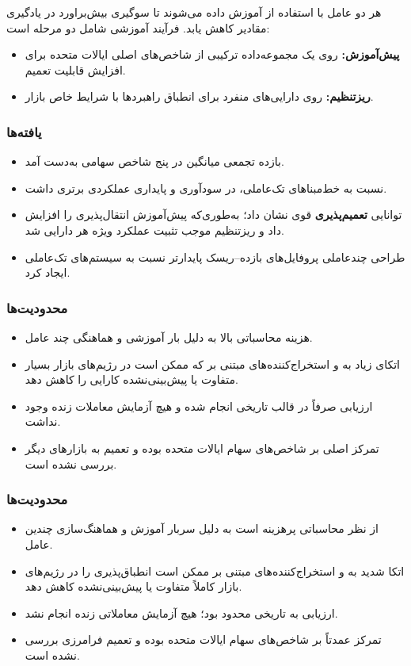 \documentclass[12pt, a4paper]{report}
\begin{document}
هر دو عامل با استفاده از  آموزش داده می‌شوند تا سوگیری بیش‌براورد در یادگیری مقادیر  کاهش یابد. فرآیند آموزشی شامل دو مرحله است:
\begin{itemize}
    \item \textbf{پیش‌آموزش:} روی یک مجموعه‌داده ترکیبی از شاخص‌های اصلی ایالات متحده برای افزایش قابلیت تعمیم.  
    \item \textbf{ریزتنظیم:} روی دارایی‌های منفرد برای انطباق راهبردها با شرایط خاص بازار.  
\end{itemize}

\subsubsection{یافته‌ها}
\begin{itemize}
    \item بازده تجمعی میانگین  در پنج شاخص سهامی به‌دست آمد.  
    \item نسبت به خط‌مبناهای تک‌عاملی، در سودآوری و پایداری عملکردی برتری داشت.  
    \item توانایی \textbf{تعمیم‌پذیری} قوی نشان داد؛ به‌طوری‌که پیش‌آموزش انتقال‌پذیری را افزایش داد و ریزتنظیم موجب تثبیت عملکرد ویژه هر دارایی شد.  
    \item طراحی چندعاملی پروفایل‌های بازده–ریسک پایدارتر نسبت به سیستم‌های تک‌عاملی ایجاد کرد.  
\end{itemize}

\subsubsection{محدودیت‌ها}
\begin{itemize}
    \item هزینه محاسباتی بالا به دلیل بار آموزشی و هماهنگی چند عامل.  
    \item اتکای زیاد به  و استخراج‌کننده‌های مبتنی بر  که ممکن است در رژیم‌های بازار بسیار متفاوت یا پیش‌بینی‌نشده کارایی را کاهش دهد.  
    \item ارزیابی صرفاً در قالب  تاریخی انجام شده و هیچ آزمایش معاملات زنده وجود نداشت.  
    \item تمرکز اصلی بر شاخص‌های سهام ایالات متحده بوده و تعمیم به بازارهای دیگر بررسی نشده است.  
\end{itemize}


\subsubsection{محدودیت‌ها}
\begin{itemize}
    \item از نظر محاسباتی پرهزینه است به دلیل سربار آموزش و هماهنگ‌سازی چندین عامل.  
    \item اتکا شدید به  و استخراج‌کننده‌های مبتنی بر  ممکن است انطباق‌پذیری را در رژیم‌های بازار کاملاً متفاوت یا پیش‌بینی‌نشده کاهش دهد.  
    \item ارزیابی به  تاریخی محدود بود؛ هیچ آزمایش معاملاتی زنده انجام نشد.  
    \item تمرکز عمدتاً بر شاخص‌های سهام ایالات متحده بوده و تعمیم فرامرزی بررسی نشده است.  
\end{itemize}
\end{document}
